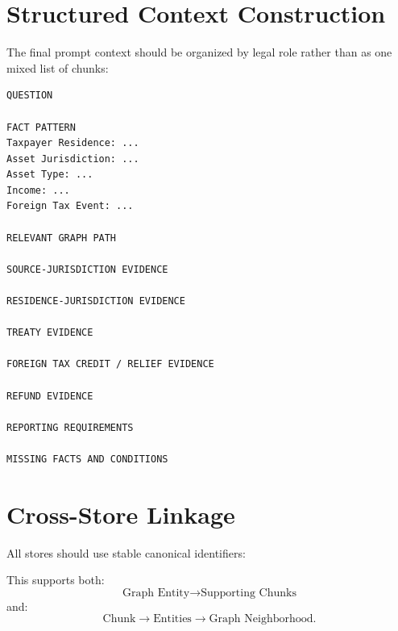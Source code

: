 \documentclass[11pt,a4paper]{article}
\begin{document}
\section{Structured Context Construction}
The final prompt context should be organized by legal role rather than as one mixed list of chunks:
\begin{lstlisting}
QUESTION

FACT PATTERN
Taxpayer Residence: ...
Asset Jurisdiction: ...
Asset Type: ...
Income: ...
Foreign Tax Event: ...

RELEVANT GRAPH PATH

SOURCE-JURISDICTION EVIDENCE

RESIDENCE-JURISDICTION EVIDENCE

TREATY EVIDENCE

FOREIGN TAX CREDIT / RELIEF EVIDENCE

REFUND EVIDENCE

REPORTING REQUIREMENTS

MISSING FACTS AND CONDITIONS
\end{lstlisting}

\section{Cross-Store Linkage}
All stores should use stable canonical identifiers:
\begin{center}
\end{center}

This supports both:
\[
\text{Graph Entity}\rightarrow\text{Supporting Chunks}
\]
and:
\[
\text{Chunk}\rightarrow\text{Entities}\rightarrow\text{Graph Neighborhood}.
\]
\end{document}

